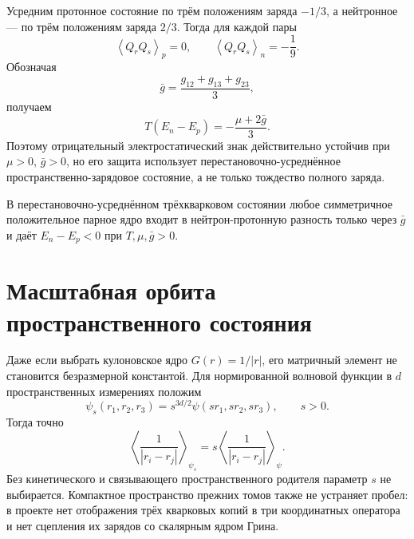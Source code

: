 Усредним протонное состояние по трём положениям заряда $-1/3$, а
нейтронное --- по трём положениям заряда $2/3$. Тогда для каждой пары
\begin{equation}
 \left\langle Q_rQ_s\right\rangle_p=0,
 \qquad
 \left\langle Q_rQ_s\right\rangle_n=-\frac19.
 \label{eq:v8-baryon-em-pair-charge-permutation-average}
\end{equation}
Обозначая
\begin{equation}
 \bar g=\frac{g_{12}+g_{13}+g_{23}}{3},
 \label{eq:v8-baryon-em-spatial-kernel-average}
\end{equation}
получаем
\begin{equation}
 T(E_n-E_p)=-\frac{\mu+2\bar g}{3}.
 \label{eq:v8-baryon-em-symmetrized-spatial-splitting}
\end{equation}
Поэтому отрицательный электростатический знак действительно устойчив при
$\mu>0$, $\bar g>0$, но его защита использует перестановочно-усреднённое
пространственно-зарядовое состояние, а не только тождество полного заряда.

\begin{proposition}
В перестановочно-усреднённом трёхкварковом состоянии любое симметричное
положительное парное ядро входит в нейтрон-протонную разность только через
$\bar g$ и даёт $E_n-E_p<0$ при $T,\mu,\bar g>0$.
\end{proposition}

\section{Масштабная орбита пространственного состояния}

Даже если выбрать кулоновское ядро $G(r)=1/|r|$, его матричный элемент не
становится безразмерной константой. Для нормированной волновой функции в
$d$ пространственных измерениях положим
\begin{equation}
 \psi_s(r_1,r_2,r_3)=s^{3d/2}\psi(sr_1,sr_2,sr_3),
 \qquad s>0.
 \label{eq:v8-baryon-em-wavefunction-dilation}
\end{equation}
Тогда точно
\begin{equation}
 \left\langle\frac1{|r_i-r_j|}\right\rangle_{\psi_s}
 =s\left\langle\frac1{|r_i-r_j|}\right\rangle_{\psi}.
 \label{eq:v8-baryon-em-coulomb-dilation}
\end{equation}
Без кинетического и связывающего пространственного родителя параметр $s$
не выбирается. Компактное пространство прежних томов также не устраняет
пробел: в проекте нет отображения трёх кварковых копий в три координатных
оператора и нет сцепления их зарядов со скалярным ядром Грина.

